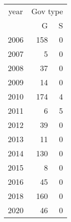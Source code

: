 \footnotesize\begin{tabular}[t]{lrr}
\toprule
\multicolumn{1}{c}{year} & \multicolumn{2}{c}{Gov type} \\
\cmidrule(l{3pt}r{3pt}){1-1} \cmidrule(l{3pt}r{3pt}){2-3}
  & G & S\\
\midrule
2006 & 158 & 0\\
2007 & 5 & 0\\
2008 & 37 & 0\\
2009 & 14 & 0\\
2010 & 174 & 4\\
2011 & 6 & 5\\
2012 & 39 & 0\\
2013 & 11 & 0\\
2014 & 130 & 0\\
2015 & 8 & 0\\
2016 & 45 & 0\\
2018 & 160 & 0\\
2020 & 46 & 0\\
\bottomrule
\end{tabular}
